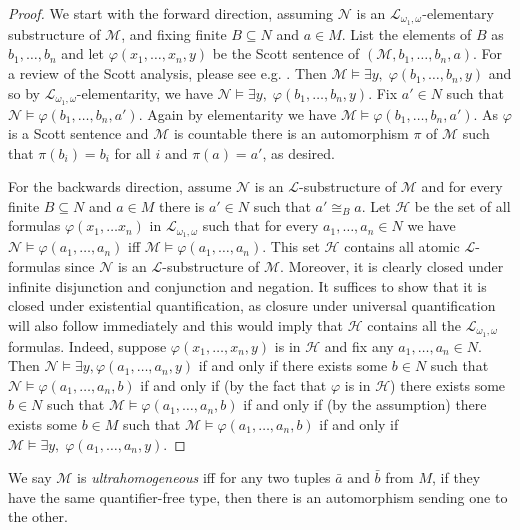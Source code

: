 \documentclass[12pt]{amsart}
\theoremstyle{plain}
\theoremstyle{definition}
\newcommand{\isom}{\cong}
\newcommand{\mcH}{\mathcal{H}}
\newcommand{\mcL}{\mathcal{L}}
\newcommand{\mcM}{\mathcal{M}}
\newcommand{\mcN}{\mathcal{N}}
\begin{document}
\begin{proof}
We start with the forward direction, assuming $\mcN$ is an $\mcL_{\omega_1, \omega}$-elementary substructure of $\mcM$, and fixing finite $B \subseteq N$ and $a \in M$.
List the elements of $B$ as $b_1, \dots, b_n$ and let $\varphi(x_1, \dots, x_n, y)$ be the Scott sentence of $(\mcM, b_1, \dots, b_n, a)$.
For a review of the Scott analysis, please see e.g. \cite[Chapter 12]{Gao2008}.
Then $\mcM \models \exists y, \; \varphi(b_1, \dots, b_n, y)$ and so by $\mcL_{\omega_1, \omega}$-elementarity, we have $\mcN \models \exists y, \; \varphi(b_1, \dots, b_n, y)$.
Fix $a' \in N$ such that $\mcN \models \varphi(b_1, \dots, b_n, a')$.
Again by elementarity we have $\mcM \models \varphi(b_1, \dots, b_n, a')$.
As $\varphi$ is a Scott sentence and $\mcM$ is countable there is an automorphism $\pi$ of $\mcM$ such that $\pi(b_i) = b_i$ for all $i$ and $\pi(a) = a'$, as desired.

For the backwards direction, assume $\mcN$ is an $\mcL$-substructure of $\mcM$ and for every finite $B \subseteq N$ and $a\in M$ there is $a' \in N$ such that $a' \isom_B a$.
Let $\mcH$ be the set of all formulas $\varphi(x_1, \dots x_n)$ in $\mcL_{\omega_1, \omega}$ such that for every $a_1, \dots, a_n \in N$ we have $\mcN \models \varphi(a_1, \dots, a_n)$ iff $\mcM \models \varphi(a_1, \dots, a_n)$.
This set $\mcH$ contains all atomic $\mcL$-formulas since $\mcN$ is an $\mcL$-substructure of $\mcM$.
Moreover, it is clearly closed under infinite disjunction and conjunction and negation.
It suffices to show that it is closed under existential quantification, as closure under universal quantification will also follow immediately and this would imply that $\mcH$ contains all the $\mcL_{\omega_1, \omega}$ formulas.
Indeed, suppose $\varphi(x_1, \dots, x_n, y)$ is in $\mcH$ and fix any $a_1, \dots, a_n \in N$.
Then $\mcN \models \exists y, \varphi(a_1, \dots, a_n, y)$ if and only if there exists some $b \in N$ such that $\mcN \models \varphi(a_1, \dots, a_n, b)$ if and only if (by the fact that $\varphi$ is in $\mcH$) there exists some $b \in N$ such that $\mcM \models \varphi(a_1, \dots, a_n, b)$ if and only if (by the assumption) there exists some $b \in M$ such that $\mcM \models \varphi(a_1, \dots, a_n, b)$ if and only if $\mcM \models \exists y, \; \varphi(a_1, \dots, a_n, y)$.
\end{proof}

We say $\mcM$ is \emph{ultrahomogeneous} iff for any two tuples $\bar{a}$ and $\bar{b}$ from $M$, if they have the same quantifier-free type, then there is an automorphism sending one to the other.
\end{document}
